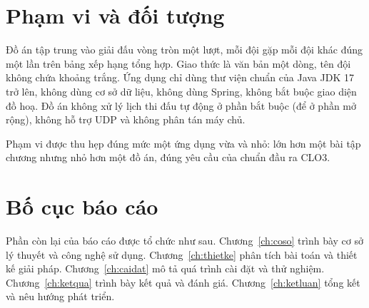 \section{Phạm vi và đối tượng}

Đồ án tập trung vào giải đấu vòng tròn một lượt, mỗi đội gặp mỗi đội khác đúng
một lần trên bảng xếp hạng tổng hợp. Giao thức là văn bản một dòng, tên đội
không chứa khoảng trắng. Ứng dụng chỉ dùng thư viện chuẩn của Java JDK 17 trở
lên, không dùng cơ sở dữ liệu, không dùng Spring, không bắt buộc giao diện đồ
hoạ. Đồ án không xử lý lịch thi đấu tự động ở phần bắt buộc (để ở phần mở
rộng), không hỗ trợ UDP và không phân tán máy chủ.

\begin{luuy}
Phạm vi được thu hẹp đúng mức một ứng dụng vừa và nhỏ: lớn hơn một bài tập
chương nhưng nhỏ hơn một đồ án, đúng yêu cầu của chuẩn đầu ra CLO3.
\end{luuy}

\section{Bố cục báo cáo}

Phần còn lại của báo cáo được tổ chức như sau. Chương~\ref{ch:coso} trình bày
cơ sở lý thuyết và công nghệ sử dụng. Chương~\ref{ch:thietke} phân tích bài
toán và thiết kế giải pháp. Chương~\ref{ch:caidat} mô tả quá trình cài đặt và
thử nghiệm. Chương~\ref{ch:ketqua} trình bày kết quả và đánh giá.
Chương~\ref{ch:ketluan} tổng kết và nêu hướng phát triển.
